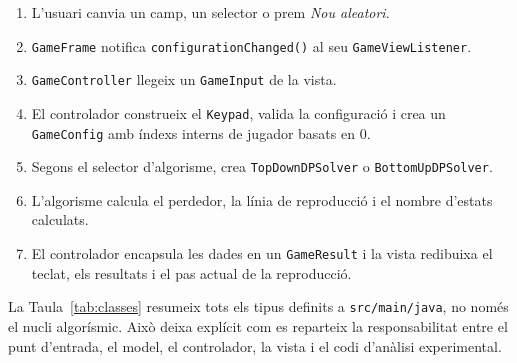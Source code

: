 \documentclass[conference,compsoc]{IEEEtran}
\begin{document}
\begin{enumerate}
    \item L'usuari canvia un camp, un selector o prem \textit{Nou aleatori}.
    \item \texttt{GameFrame} notifica \texttt{configurationChanged()} al seu
          \texttt{GameViewListener}.
    \item \texttt{GameController} llegeix un \texttt{GameInput} de la vista.
    \item El controlador construeix el \texttt{Keypad}, valida la configuració i
          crea un \texttt{GameConfig} amb índexs interns de jugador basats en 0.
    \item Segons el selector d'algorisme, crea \texttt{TopDownDPSolver} o
          \texttt{BottomUpDPSolver}.
    \item L'algorisme calcula el perdedor, la línia de reproducció i el nombre
          d'estats calculats.
    \item El controlador encapsula les dades en un \texttt{GameResult} i la vista
          redibuixa el teclat, els resultats i el pas actual de la reproducció.
\end{enumerate}

La Taula~\ref{tab:classes} resumeix tots els tipus definits a
\texttt{src/main/java}, no només el nucli algorísmic. Això deixa explícit com es
reparteix la responsabilitat entre el punt d'entrada, el model, el controlador,
la vista i el codi d'anàlisi experimental.
\end{document}
